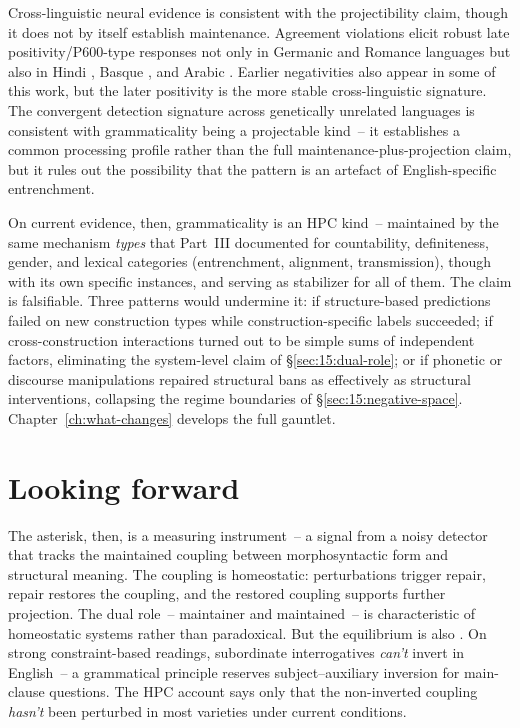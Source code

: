 Cross-linguistic neural evidence is consistent with the projectibility claim, though it does not by itself establish maintenance. Agreement violations elicit robust late positivity/P600-type responses not only in Germanic and Romance languages but also in Hindi \parencite{Nevins2007}, Basque \parencite{Zawiszewski2009}, and Arabic \parencite{MuralikrishnanIdrissi2021}. Earlier negativities also appear in some of this work, but the later positivity is the more stable cross-linguistic signature. The convergent detection signature across genetically unrelated languages is consistent with grammaticality being a projectable kind~-- it establishes a common processing profile rather than the full maintenance-plus-projection claim, but it rules out the possibility that the pattern is an artefact of English-specific entrenchment.

On current evidence, then, grammaticality is an HPC kind~-- maintained by the same mechanism \emph{types} that Part~III documented for countability, definiteness, gender, and lexical categories (entrenchment, alignment, transmission), though with its own specific instances, and serving as stabilizer for all of them. The claim is falsifiable. Three patterns would undermine it: if structure-based predictions failed on new construction types while construction-specific labels succeeded; if cross-construction interactions turned out to be simple sums of independent factors, eliminating the system-level claim of §\ref{sec:15:dual-role}; or if phonetic or discourse manipulations repaired structural bans as effectively as structural interventions, collapsing the regime boundaries of §\ref{sec:15:negative-space}. Chapter~\ref{ch:what-changes} develops the full gauntlet.


\section{Looking forward}
\label{sec:15:looking-forward}

The asterisk, then, is a measuring instrument~-- a signal from a noisy detector that tracks the maintained coupling between morphosyntactic form and structural meaning. The coupling is homeostatic: perturbations trigger repair, repair restores the coupling, and the restored coupling supports further projection. The dual role~-- maintainer and maintained~-- is characteristic of homeostatic systems rather than paradoxical. But the equilibrium is also . On strong constraint-based readings, subordinate interrogatives \emph{can't} invert in English~-- a grammatical principle reserves subject--auxiliary inversion for main-clause questions. The HPC account says only that the non-inverted coupling \emph{hasn't} been perturbed in most varieties under current conditions.

